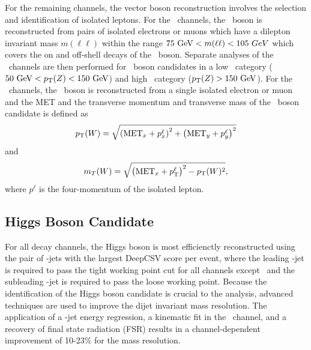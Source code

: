 For the remaining channels, the vector boson reconstruction involves the selection and identification of isolated leptons. For the \ZllH\ channels, the \bosZ\ boson is reconstructed from pairs of isolated electrons or muons which have a dilepton invariant mass $m(\ell\ell)$ within the range $75\ \mathrm{GeV} < m(\ell\ell) < 105\ GeV$ which covers the on and off-shell decays of the \bosZ\ boson. Separate analyses of the \ZllH\ channels are then performed for \bosZ\ boson candidates in a low \pT\ category ($50\ \mathrm{GeV} < p_{\mathrm{T}}(Z) < 150\ \mathrm{GeV}$) and high \pT\ category ($p_{\mathrm{T}}(Z) > 150\ \mathrm{GeV}$). For the \WlnH\ channels, the \bosW\ boson is reconstructed from a single isolated electron or muon and the MET and the transverse momentum and transverse mass of the \bosW\ boson candidate is defined as
\begin{equation}
  \pT(\bosW) = \sqrt{\left( \mathrm{MET}_{x} + p_{x}^{\ell} \right)^{2} + \left( \mathrm{MET}_{y} + p_{y}^{\ell} \right)^{2}}
  \label{eq:WlnWpT}
\end{equation}
and
\begin{equation}
  m_{T}(\bosW) = \sqrt{\left( \mathrm{MET}_{x} + p_{\mathrm{T}}^{\ell} \right)^{2} - \pT(\bosW)^{2}},
  \label{eq:WlnWmT}
\end{equation}
where $p^{\ell}$ is the four-momentum of the isolated lepton.

\subsection{Higgs Boson Candidate}

For all decay channels, the Higgs boson is most efficienctly reconstructed using the pair of \qrkb-jets with the largest DeepCSV score per event, where the leading \qrkb-jet is required to pass the tight working point cut for all channels except \ZllH\ and the subleading \qrkb-jet is required to pass the loose working point. Because the identification of the Higgs boson candidate is crucial to the analysis, advanced techniques are used to improve the dijet invariant mass resolution. The application of a \qrkb-jet energy regression, a kinematic fit in the \ZllH\ channel, and a recovery of final state radiation (FSR) results in a channel-dependent improvement of 10-23\% for the mass resolution.

